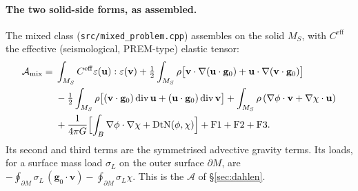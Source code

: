\documentclass[11pt]{article}
\theoremstyle{definition}
\theoremstyle{remark}
\newcommand{\bu}{\mathbf{u}}
\newcommand{\bv}{\mathbf{v}}
\newcommand{\Div}{\operatorname{div}}
\newcommand{\code}[1]{\texttt{#1}}
\begin{document}
\paragraph{The two solid-side forms, as assembled.} The mixed class
(\code{src/mixed\_problem.cpp}) assembles on the solid $M_S$, with
$C^{\mathrm{eff}}$ the effective (seismological, PREM-type) elastic
tensor:
\begin{equation*}
\begin{aligned}
  \mathcal A_{\mathrm{mix}} ={}&
  \int_{M_S} C^{\mathrm{eff}}\varepsilon(\bu):\varepsilon(\bv)
  + \tfrac12\int_{M_S}\rho\bigl[\bv\cdot\nabla(\bu\cdot\mathbf g_0)
     + \bu\cdot\nabla(\bv\cdot\mathbf g_0)\bigr] \\
  &- \tfrac12\int_{M_S}\rho\bigl[(\bv\cdot\mathbf g_0)\Div\bu
     + (\bu\cdot\mathbf g_0)\Div\bv\bigr]
  + \int_{M_S}\rho\,(\nabla\phi\cdot\bv + \nabla\chi\cdot\bu) \\
  &
  + \frac{1}{4\pi G}\Bigl[\int_B\nabla\phi\cdot\nabla\chi
     + \mathrm{DtN}(\phi, \chi)\Bigr]
  + \text{F1} + \text{F2} + \text{F3} .
\end{aligned}
\end{equation*}
Its second and third terms are the symmetrised advective gravity
terms. Its loads, for a surface mass load $\sigma_L$ on the outer
surface $\partial M$, are $-\oint_{\partial M}\sigma_L\,(\mathbf
g_0\cdot\bv) - \oint_{\partial M}\sigma_L\chi$. This is the
$\mathcal A$ of \S\ref{sec:dahlen}.
\end{document}
